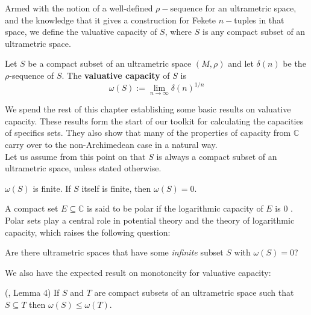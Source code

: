 Armed with the notion of a well-defined $\rho-$sequence for an ultrametric space, and the knowledge that it gives a construction for Fekete $n-$tuples in that space, we define the valuative capacity of $S$, where $S$ is any compact subset of an ultrametric space.\\

\begin{definition}
	\cite{kj}  Let $S$ be a compact subset of an ultrametric space $(M,\rho)$ and let $\delta(n)$ be the $\rho$-sequence of $S$. The \textbf{valuative capacity} of $S$ is \[\omega(S)
	:= \lim_{n\to\infty} \delta(n)^{1/n}\]  
\end{definition}

We spend the rest of this chapter establishing some basic results on valuative capacity. These results form the start of our toolkit for calculating the capacities of specifics sets. They also show that many of the properties of capacity from $\mathbb{C}$ carry over to the non-Archimedean case in a natural way. \\

Let us assume from this point on that $S$ is always a compact subset of an ultrametric space, unless stated otherwise.\\ 

\begin{proposition}
 $\omega(S)$ is finite. If $S$ itself is finite, then $\omega(S) =0$.
\end{proposition}

A compact set $E \subseteq \mathbb{C}$ is said to be polar if the logarithmic capacity of $E$ is $0$ \cite{rand}. Polar sets play a central role in potential theory and the theory of logarithmic capacity, which raises the following question:\\

\begin{question}
Are there ultrametric spaces that have some \textit{infinite} subset $S$ with $\omega(S)=0$?
\end{question}

We also have the expected result on monotoncity for valuative capacity:\\

\begin{proposition}
	(\cite{kj}, Lemma 4) If $S$ and $T$ are compact subsets of an ultrametric space such that $S \subseteq T$ then $\omega(S) \leq \omega(T)$. 
\end{proposition}


